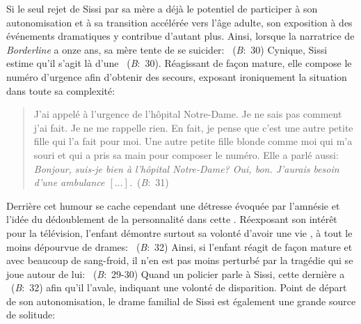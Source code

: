 \par
Si le seul rejet de Sissi par sa mère a déjà le potentiel de participer à son autonomisation et à sa transition accélérée vers l'âge adulte, son exposition à des événements dramatiques y contribue d'autant plus.
Ainsi, lorsque la narratrice de \textit{Borderline} a onze ans, sa mère tente de se suicider: ~(\textit{B}:~30)
Cynique, Sissi estime qu'il s'agit là d'une ~(\textit{B}:~30).
Réagissant de façon mature, elle compose le numéro d'urgence afin d'obtenir des secours, exposant ironiquement la situation dans toute sa complexité:
\begin{quote}
  \begin{singlespace}
    \small
    J'ai appelé à l'urgence de l'hôpital Notre-Dame. Je ne sais pas comment j'ai fait. Je ne me rappelle rien. En fait, je pense que c'est une autre petite fille qui l'a fait pour moi. Une autre petite fille blonde comme moi qui m'a souri et qui a pris sa main pour composer le numéro. Elle a parlé aussi: \textit{Bonjour, suis-je bien à l'hôpital Notre-Dame? Oui, bon. J'aurais besoin d'une ambulance $\left[ \dots \right]$.}~(\textit{B}:~31)
    \normalsize
  \end{singlespace}
\end{quote}
Derrière cet humour se cache cependant une détresse évoquée par l'amnésie et l'idée du dédoublement de la personnalité dans cette .
Réexposant son intérêt pour la télévision, l'enfant démontre surtout sa volonté d'avoir une vie , à tout le moins dépourvue de drames: ~(\textit{B}:~32)
Ainsi, si l'enfant réagit de façon mature et avec beaucoup de sang-froid, il n'en est pas moins perturbé par la tragédie qui se joue autour de lui: ~(\textit{B}:~29-30)
Quand un policier parle à Sissi, cette dernière a ~(\textit{B}:~32) afin qu'il l'avale, indiquant une volonté de disparition.
Point de départ de son autonomisation, le drame familial de Sissi est également une grande source de solitude:
